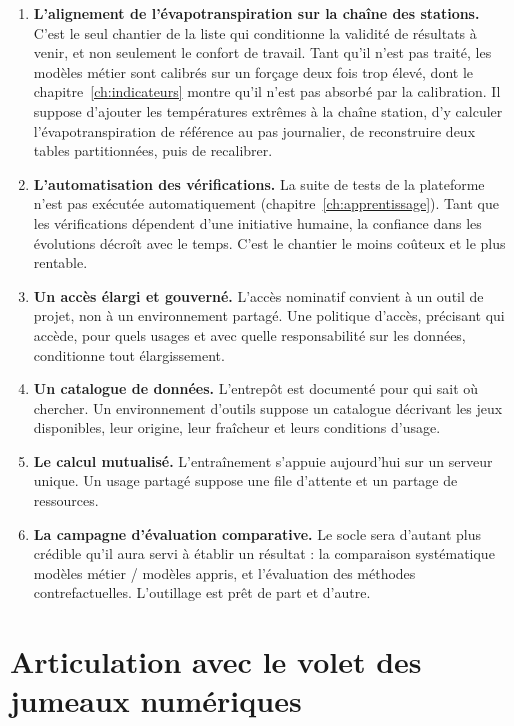 \begin{enumerate}
  \item \textbf{L'alignement de l'évapotranspiration sur la chaîne des stations.} C'est le seul
  chantier de la liste qui conditionne la validité de résultats à venir, et non seulement le
  confort de travail. Tant qu'il n'est pas traité, les modèles métier sont calibrés sur un
  forçage deux fois trop élevé, dont le chapitre~\ref{ch:indicateurs} montre qu'il n'est pas
  absorbé par la calibration. Il suppose d'ajouter les températures extrêmes à la chaîne
  station, d'y calculer l'évapotranspiration de référence au pas journalier, de reconstruire
  deux tables partitionnées, puis de recalibrer.

  \item \textbf{L'automatisation des vérifications.} La suite de tests de la plateforme n'est pas
  exécutée automatiquement (chapitre~\ref{ch:apprentissage}). Tant que les vérifications
  dépendent d'une initiative humaine, la confiance dans les évolutions décroît avec le temps.
  C'est le chantier le moins coûteux et le plus rentable.

  \item \textbf{Un accès élargi et gouverné.} L'accès nominatif convient à un outil de projet, non
  à un environnement partagé. Une politique d'accès, précisant qui accède, pour quels usages et avec quelle
  responsabilité sur les données, conditionne tout élargissement.

  \item \textbf{Un catalogue de données.} L'entrepôt est documenté pour qui sait où chercher.
  Un environnement d'outils suppose un catalogue décrivant les jeux disponibles, leur origine,
  leur fraîcheur et leurs conditions d'usage.

  \item \textbf{Le calcul mutualisé.} L'entraînement s'appuie aujourd'hui sur un serveur unique.
  Un usage partagé suppose une file d'attente et un partage de ressources.

  \item \textbf{La campagne d'évaluation comparative.} Le socle sera d'autant plus crédible qu'il
  aura servi à établir un résultat : la comparaison systématique modèles métier / modèles appris,
  et l'évaluation des méthodes contrefactuelles. L'outillage est prêt de part et d'autre.
\end{enumerate}

\section{Articulation avec le volet des jumeaux numériques}

